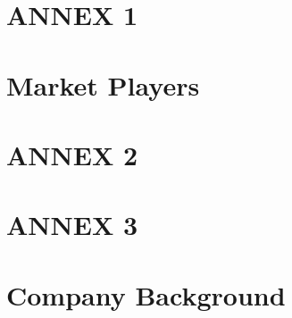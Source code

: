 \documentclass[11pt]{article}
\begin{document}
\section{ANNEX 1}
\newpage
\section{Market Players}
\newpage
\section{ANNEX 2}
\newpage
\section{ANNEX 3}
\newpage
\section{Company Background}
\end{document}
